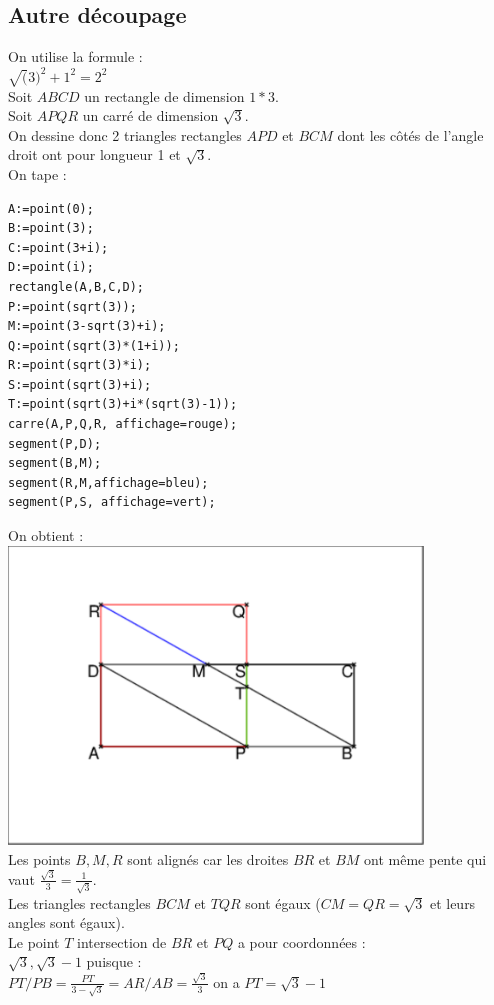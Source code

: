 \documentclass[a4paper,11pt]{book}
\begin{document}
\subsection{Autre d\'ecoupage}
On utilise la formule :\\
$\sqrt(3)^2+1^2=2^2$\\
Soit $ABCD$ un rectangle de dimension $1*3$.\\
Soit $APQR$ un carr\'e de dimension $\sqrt 3$.\\
On dessine donc 2 triangles rectangles $APD$ et $BCM$ dont les c\^ot\'es de 
l'angle droit ont pour longueur 1 et $\sqrt 3$.\\
On tape :
\begin{verbatim}
A:=point(0);
B:=point(3);
C:=point(3+i);
D:=point(i);
rectangle(A,B,C,D);
P:=point(sqrt(3));
M:=point(3-sqrt(3)+i);
Q:=point(sqrt(3)*(1+i));
R:=point(sqrt(3)*i);
S:=point(sqrt(3)+i);
T:=point(sqrt(3)+i*(sqrt(3)-1));
carre(A,P,Q,R, affichage=rouge);
segment(P,D);
segment(B,M);
segment(R,M,affichage=bleu);
segment(P,S, affichage=vert);
\end{verbatim}
On obtient :\\
\includegraphics[width=11cm]{carresqrt31}\\
Les points $B,M,R$ sont align\'es car les droites $BR$ et $BM$ ont m\^eme pente
qui vaut $\frac{\sqrt 3}{3}=\frac{1}{\sqrt 3}$.\\
Les triangles rectangles $BCM$ et $TQR$ sont \'egaux ($CM=QR=\sqrt 3$ et leurs 
angles sont \'egaux).\\
Le point $T$ intersection de $BR$ et $PQ$ a pour coordonn\'ees :\\
$\sqrt 3,\sqrt 3 -1$ puisque :\\
$PT/PB=\frac{PT}{3-\sqrt 3}=AR/AB=\frac{\sqrt 3}{3}$
on a $PT=\sqrt 3-1$\\
\end{document}
